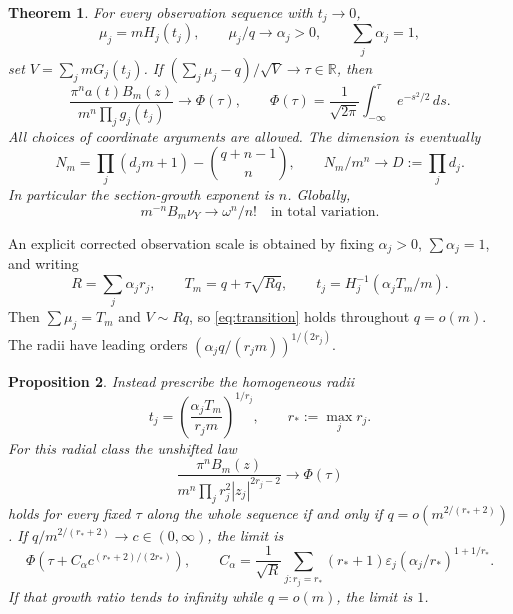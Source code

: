 \documentclass[11pt]{article}
\newtheorem{theorem}{Theorem}
\newtheorem{proposition}[theorem]{Proposition}
\theoremstyle{remark}\newtheorem{remark}[theorem]{Remark}
\newcommand{\R}{\mathbb R}
\begin{document}
\begin{theorem}\label{thm:base}
For every observation sequence with $t_j\to0$,
\[
 \mu_j=mH_j(t_j),\qquad \mu_j/q\longrightarrow\alpha_j>0,
 \qquad \sum_j\alpha_j=1,
\]
set $V=\sum_j mG_j(t_j)$. If
$ (\sum_j\mu_j-q)/\sqrt V\to\tau\in\R$, then
\begin{equation}\label{eq:transition}
 \frac{\pi^n a(t)B_m(z)}{m^n\prod_jg_j(t_j)}\longrightarrow
 \Phi(\tau),\qquad
 \Phi(\tau)=\frac1{\sqrt{2\pi}}\int_{-\infty}^{\tau}e^{-s^2/2}\,ds.
\end{equation}
All choices of coordinate arguments are allowed. The dimension is eventually
\begin{equation}\label{eq:dimension}
 N_m=\prod_j(d_jm+1)-\binom{q+n-1}{n},\qquad
 N_m/m^n\longrightarrow D:=\prod_jd_j.
\end{equation}
In particular the section-growth exponent is $n$. Globally,
\begin{equation}\label{eq:measure}
 m^{-n}B_m\nu_Y\longrightarrow\omega^n/n!
 \quad\text{in total variation}.
\end{equation}
\end{theorem}

An explicit corrected observation scale is obtained by fixing
$\alpha_j>0$, $\sum\alpha_j=1$, and writing
\begin{equation}\label{eq:corrected}
 R=\sum_j\alpha_jr_j,\qquad T_m=q+\tau\sqrt{Rq},\qquad
 t_j=H_j^{-1}(\alpha_jT_m/m).
\end{equation}
Then $\sum\mu_j=T_m$ and $V\sim Rq$, so \eqref{eq:transition} holds
throughout $q=o(m)$. The radii have leading orders
$(\alpha_jq/(r_jm))^{1/(2r_j)}$.

\begin{proposition}\label{prop:shift}
Instead prescribe the homogeneous radii
\begin{equation}\label{eq:homogeneous}
 t_j=\left(\frac{\alpha_j T_m}{r_jm}\right)^{1/r_j},
 \qquad r_*:=\max_j r_j.
\end{equation}
For this radial class the unshifted law
\[
 \frac{\pi^nB_m(z)}{m^n\prod_j r_j^2|z_j|^{2r_j-2}}
 \longrightarrow\Phi(\tau)
\]
holds for every fixed $\tau$ along the whole sequence if and only if
$q=o(m^{2/(r_*+2)})$. If $q/m^{2/(r_*+2)}\to c\in(0,\infty)$,
the limit is
\[
 \Phi\left(\tau+C_\alpha c^{(r_*+2)/(2r_*)}\right),\qquad
 C_\alpha=\frac1{\sqrt R}\sum_{j:r_j=r_*}
 (r_*+1)\varepsilon_j(\alpha_j/r_*)^{1+1/r_*}.
\]
If that growth ratio tends to infinity while $q=o(m)$, the limit is $1$.
\end{proposition}
\end{document}
